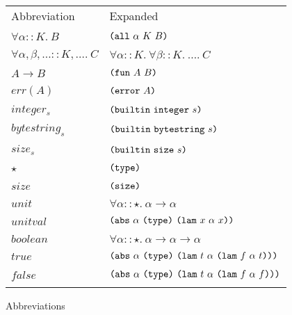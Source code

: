 \documentclass[../main.tex]{subfiles}
\begin{document}
\begin{figure*}[t]
    \footnotesize

    \begin{tabular}{ll}
        \textrm{Abbreviation} & \textrm{Expanded}\\\\

        $\forall \alpha :: K.\ B$ & \(\texttt{(} \texttt{all} ~ \alpha ~ K ~ B \texttt{)}\)\\\\

        $\forall \alpha, \beta, \ldots :: K, \ldots.\ C$ & \(\forall \alpha :: K.\ \forall \beta :: K.\ \ldots.\ C\)\\\\

        $A \to B$ & \(\texttt{(} \texttt{fun} ~ A ~ B \texttt{)}\)\\\\

        $err(A)$ & \(\texttt{(} \texttt{error} ~ A \texttt{)}\)\\\\

        $integer_s$ & \(\texttt{(} \texttt{builtin} ~ \texttt{integer} ~ s \texttt{)}\)\\\\

        $bytestring_s$ & \(\texttt{(} \texttt{builtin} ~ \texttt{bytestring} ~ s \texttt{)}\)\\\\

        $size_s$ & \(\texttt{(} \texttt{builtin} ~ \texttt{size} ~ s \texttt{)}\)\\\\

        $\star$ & \(\texttt{(} \texttt{type} \texttt{)}{}\)\\\\

        $size$ & \(\texttt{(} \texttt{size} \texttt{)}{}\)\\\\

        $unit$ & \(\forall \alpha :: \star.\ \alpha \to \alpha\)\\\\

        $unitval$ & \(\texttt{(} \texttt{abs} ~ \alpha ~ \texttt{(} \texttt{type} \texttt{)}{} ~ \texttt{(} \texttt{lam} ~ x ~ \alpha ~ x \texttt{)} \texttt{)}\)\\\\

        $boolean$ & \(\forall \alpha :: \star.\ \alpha \to \alpha \to \alpha\)\\\\

        $true$ & \(\texttt{(} \texttt{abs} ~ \alpha ~ \texttt{(} \texttt{type} \texttt{)}{} ~ \texttt{(} \texttt{lam} ~ t ~ \alpha ~ \texttt{(} \texttt{lam} ~ f ~ \alpha ~ t \texttt{)} \texttt{)} \texttt{)}\)\\\\

        $false$ & \(\texttt{(} \texttt{abs} ~ \alpha ~ \texttt{(} \texttt{type} \texttt{)}{} ~ \texttt{(} \texttt{lam} ~ t ~ \alpha ~ \texttt{(} \texttt{lam} ~ f ~ \alpha ~ f \texttt{)} \texttt{)} \texttt{)}\)\\\\

    \end{tabular}

    \caption{Abbreviations}
    \label{fig:Plutus_core_type_abbreviations}
\end{figure*}
\end{document}
